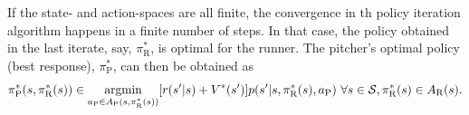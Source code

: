 \documentclass[11pt]{article}
\newcommand{\argmin}{\operatornamewithlimits{argmin}}
\begin{document}
       If the state- and action-spaces are all finite, the convergence in th policy iteration algorithm happens in a finite number of steps. In that case, the policy obtained in the last iterate, say, $\pi_\text{R}^*$, is optimal for the runner. The pitcher's optimal policy (best response), $\pi_\text{P}^*$, can then be obtained as 
       \begingroup
       \allowdisplaybreaks
       \[
       \pi_\text{P}^*(s,\pi_\text{R}^*(s)) \in \argmin_{a_\text{P} \in A_\text{P}(s,\pi_\text{R}^*(s))}[r(s'|s) + V^*(s')] p(s'|s,\pi_\text{R}^*(s),a_\text{P}) \ \forall s \in {\cal S}, \pi_\text{R}^*(s) \in A_\text{R}(s).
       \]
       \endgroup
        
\end{document}
